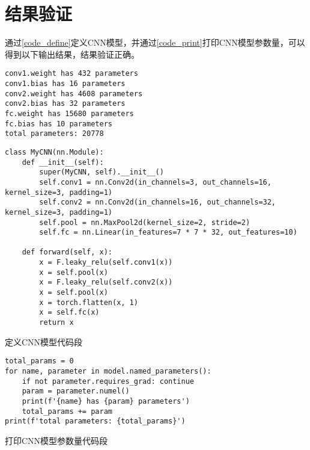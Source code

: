 \section{结果验证}\label{sec:verification}

通过\cref{code_define}定义CNN模型，并通过\cref{code_print}打印CNN模型参数量，可以得到以下输出结果，结果验证正确。

\begin{listing}[htbp]
	\begin{verbatim}
conv1.weight has 432 parameters
conv1.bias has 16 parameters
conv2.weight has 4608 parameters
conv2.bias has 32 parameters
fc.weight has 15680 parameters
fc.bias has 10 parameters
total parameters: 20778
	\end{verbatim}
\end{listing}

\begin{listing}[htbp]
  \begin{verbatim}
class MyCNN(nn.Module):
    def __init__(self):
        super(MyCNN, self).__init__()
        self.conv1 = nn.Conv2d(in_channels=3, out_channels=16, kernel_size=3, padding=1)
        self.conv2 = nn.Conv2d(in_channels=16, out_channels=32, kernel_size=3, padding=1)
        self.pool = nn.MaxPool2d(kernel_size=2, stride=2)
        self.fc = nn.Linear(in_features=7 * 7 * 32, out_features=10)

    def forward(self, x):
        x = F.leaky_relu(self.conv1(x))
        x = self.pool(x)
        x = F.leaky_relu(self.conv2(x))
        x = self.pool(x)
        x = torch.flatten(x, 1)
        x = self.fc(x)
        return x
  \end{verbatim}
  \caption{定义CNN模型代码段}\label{code_define}
\end{listing}

\begin{listing}[htbp]
	\begin{verbatim}
total_params = 0
for name, parameter in model.named_parameters():
    if not parameter.requires_grad: continue
    param = parameter.numel()
    print(f'{name} has {param} parameters')
    total_params += param
print(f'total parameters: {total_params}')
	\end{verbatim}
	\caption{打印CNN模型参数量代码段}\label{code_print}
\end{listing}